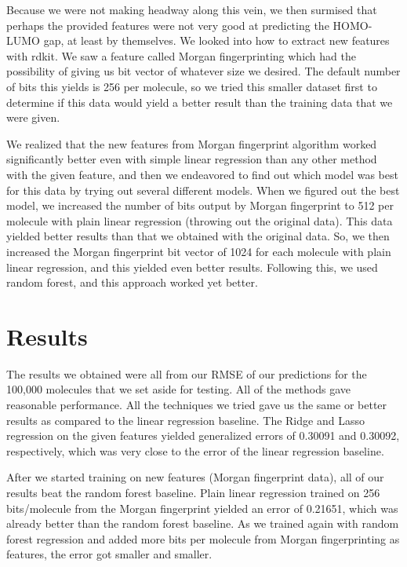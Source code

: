 \documentclass[11pt]{article}
\begin{document}
Because we were not making headway along this vein, we then surmised that perhaps the provided features were not very good at predicting the HOMO-LUMO gap, at least by themselves. We looked into how to extract new features with rdkit. We saw a feature called Morgan fingerprinting which had the possibility of giving us bit vector of whatever size we desired. The default number of bits this yields is 256 per molecule, so we tried this smaller dataset first to determine if this data would yield a better result than the training data that we were given. 

We realized that the new features from Morgan fingerprint algorithm worked significantly better even with simple linear regression than any other method with the given feature, and then we endeavored to find out which model was best for this data by trying out several different models. When we figured out the best model, we increased the number of bits output by Morgan fingerprint to 512 per molecule with plain linear regression (throwing out the original data). This data yielded better results than that we obtained with the original data. So, we then increased the Morgan fingerprint bit vector of 1024 for each molecule with plain linear regression, and this yielded even better results. Following this, we used random forest, and this approach worked yet better.

\section{Results}

The results we obtained were all from our RMSE of our predictions for the 100,000 molecules that we set aside for testing. All of the methods gave reasonable performance. All the techniques we tried gave us the same or better results as compared to the linear regression baseline. The Ridge and Lasso regression on the given features yielded generalized errors of 0.30091 and 0.30092, respectively, which was very close to the error of the linear regression baseline. 

After we started training on new features (Morgan fingerprint data), all of our results beat the random forest baseline. Plain linear regression trained on 256 bits/molecule from the Morgan fingerprint yielded an error of 0.21651, which was already better than the random forest baseline. As we trained again with random forest regression and added more bits per molecule from Morgan fingerprinting as features, the error got smaller and smaller.
\end{document}
